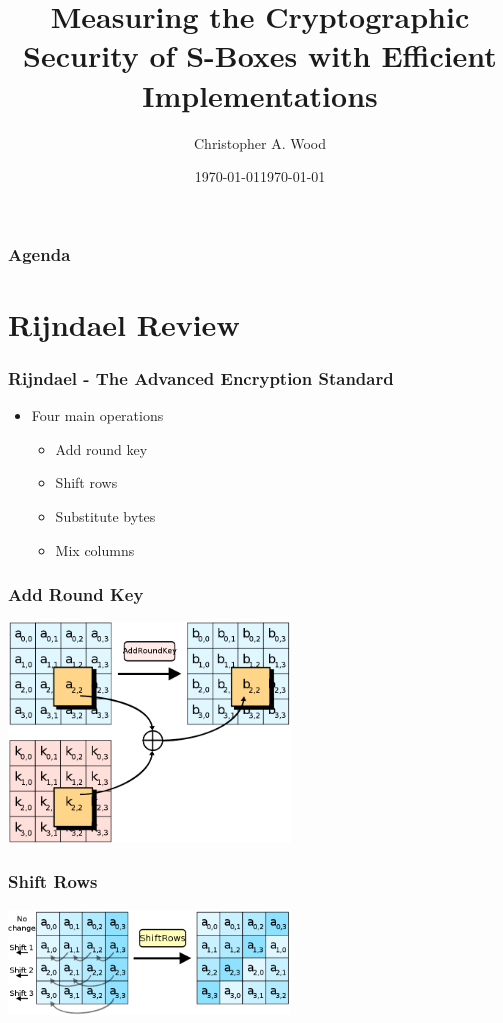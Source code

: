 \documentclass[handout]{beamer}
\title[S-box Security and Implementations]{Measuring the Cryptographic Security of S-Boxes with Efficient Implementations}
\institute[RIT]{}
\date{\today}
\author{Christopher A. Wood}
\date{\today}
\begin{document}

\begin{frame}
	\titlepage
\end{frame}

\begin{frame}
	\frametitle{Agenda}
	\tableofcontents
\end{frame}
\section{Rijndael Review}
\begin{frame}
	\frametitle{Rijndael - The Advanced Encryption Standard}
	\begin{itemize}
		\item Four main operations
		\begin{itemize}
			\item Add round key
			\item Shift rows
			\item Substitute bytes
			\item Mix columns
		\end{itemize}
	\end{itemize}
\end{frame}

\begin{frame}
	\frametitle{Add Round Key}
	\begin{center}
      		\includegraphics[width=75mm]{images/ark.png}
	\end{center}
\end{frame}

\begin{frame}
	\frametitle{Shift Rows}
	\begin{center}
      		\includegraphics[width=75mm]{images/shift.png}
	\end{center}
\end{frame}
\end{document}
